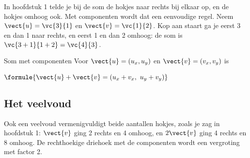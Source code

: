 In hoofdstuk 1 telde je bij de som de hokjes naar rechts bij elkaar op, en de hokjes omhoog ook. Met componenten wordt dat een eenvoudige regel. Neem $\vect{u} = \vc{3}{1}$ en $\vect{v} = \vc{1}{2}$. Kop aan staart ga je eerst 3 en dan 1 naar rechts, en eerst 1 en dan 2 omhoog: de som is $\vc{3 + 1}{1 + 2} = \vc{4}{3}$.

\begin{theorie}
\begin{minipage}[t]{.6\linewidth}
\vspace{0pt}
\begin{stelling}{Som met componenten}
Voor $\vect{u} = (u_x, u_y)$ en $\vect{v} = (v_x, v_y)$ is

\vspace{1mm}
\qquad $\formule{\vect{u} + \vect{v} = (u_x + v_x,\ u_y + v_y)}$
\end{stelling}
\end{minipage}\hfill
\begin{minipage}[t]{.36\linewidth}
\vspace{1mm}
\centering
{}
\end{minipage}
\end{theorie}


\subsection{Het veelvoud}

Ook een veelvoud vermenigvuldigt beide aantallen hokjes, zoals je zag in hoofdstuk 1: $\vect{v}$ ging 2 rechts en 4 omhoog, en $2\vect{v}$ ging 4 rechts en 8 omhoog. De rechthoekige driehoek met de componenten wordt een vergroting met factor 2.

